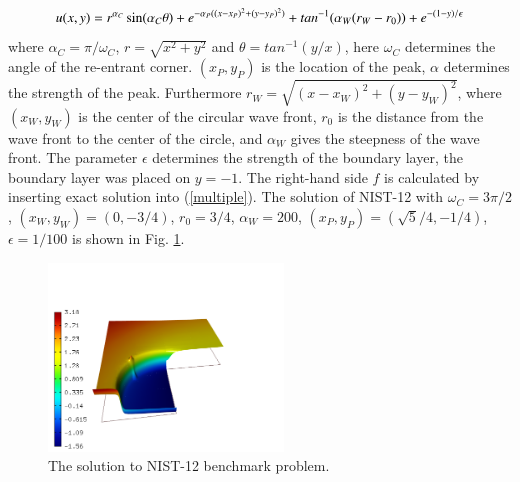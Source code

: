 \documentclass[12pt]{elsarticle}
\begin{document}
\[
u(x,y) =  r^{\alpha_{C} }\sin(\alpha_{C} \theta)
+ e^{-\alpha_{P} ((x - x_{P})^{2} + (y - y_{P})^{2})}
+ tan^{-1}(\alpha_{W} (r_{W} - r_{0})) \\
+ e^{-(1 - y) / \epsilon}
\]
where $\alpha_C = \pi / \omega_C$, $r = \sqrt{x^2+y^2}$
and $\theta = tan^{-1}(y/x)$, here $\omega_C$ determines
the angle of the re-entrant corner.
$(x_{P}, y_{P})$ is the location of the peak, $\alpha$
determines the strength of the peak. Furthermore
$r_{W} = \sqrt{(x - x_{W})^{2} + (y - y_{W})^{2}}$,
where $(x_{W}, y_{W})$ is the center of the circular wave front,
$r_{0}$ is the distance from the wave front to the
center of the circle, and $\alpha_W$ gives
the steepness of the wave front. The parameter $\epsilon$ determines the
strength of the boundary layer, the boundary layer was placed on $y = -1$.
The right-hand side $f$ is calculated by inserting exact solution into (\ref{multiple}).
The solution of NIST-12 with $\omega_C = 3 \pi /2$,
$(x_{W}, y_{W}) = (0, -3/4)$, $r_{0} = 3/4$, $\alpha_{W} = 200$,
$(x_{P}, y_{P}) = (\sqrt{5} / 4, -1/4)$,
$\epsilon = 1/100$ is shown in Fig. \ref{fig:sln-nist12}.

\begin{figure}[H]
\centering
\vspace{-5mm}
\includegraphics[height=5cm]{nist/nist-12/solution.png}
\vspace{-5mm}
\caption{The solution to NIST-12 benchmark problem.}
\vspace{-4mm}
\label{fig:sln-nist12}
\end{figure}
\end{document}
